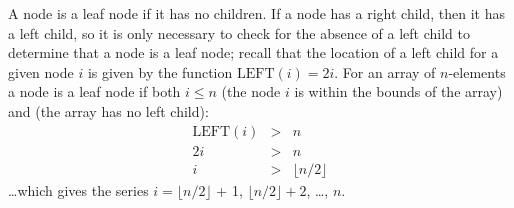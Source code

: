 A node is a leaf node if it has no children. If a node has a right child, then it has a left child, so it is only necessary to check for the absence of a left child to determine that a node is a leaf node; recall that the location of a left child for a given node $i$ is given by the function $\text{LEFT}(i) = 2i$. For an array of $n$-elements a node is a leaf node if both $i \leq n$ (the node $i$ is within the bounds of the array) and (the array has no left child):
\begin{eqnarray*}
	\text{LEFT}(i) & > & n \\
	2i & > & n \\
	i & > & \lfloor n / 2 \rfloor
\end{eqnarray*}
\ldots which gives the series $i = \lfloor n / 2 \rfloor$ + 1, $\lfloor n / 2 \rfloor + 2$, \ldots, $n$.

